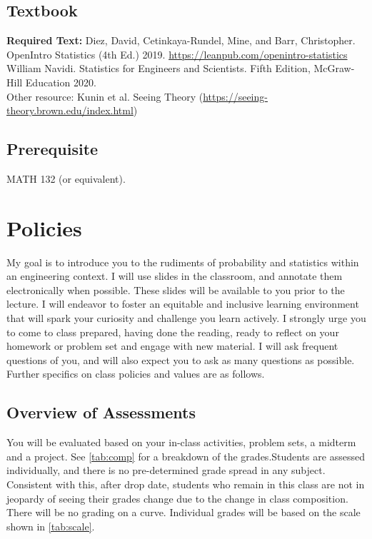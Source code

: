 \documentclass[11pt,twoside]{article}
\numberwithin{equation}{section}
\newcommand{\?}{\stackrel{?}{=}}
\begin{document}
\subsection{Textbook}

{\bf Required Text:}
Diez, David, Cetinkaya-Rundel, Mine, and Barr, Christopher. OpenIntro Statistics (4th Ed.) 2019.
\url{https://leanpub.com/openintro-statistics}\\

William Navidi. Statistics for Engineers and Scientists. Fifth Edition, McGraw-Hill Education 2020. \\

\noindent Other resource: Kunin et al. Seeing Theory (\url{https://seeing-theory.brown.edu/index.html})
\subsection{Prerequisite}
MATH 132 (or equivalent).

\section{Policies}
My goal is to introduce you to the rudiments of probability and statistics within an engineering context.
I will use slides in the classroom, and annotate them electronically when possible.
These slides will be available to you prior to the lecture.
I will endeavor to foster an equitable and inclusive learning environment that will spark your curiosity and challenge you learn actively.
I strongly urge you to come to class prepared, having done the reading, ready to reflect on your homework or problem set and engage with new material.
I will ask frequent questions of you, and will also expect you to ask as many questions as possible.
Further specifics on class policies and values are as follows.

\subsection{Overview of Assessments}
You will be evaluated based on your in-class activities, problem sets, a midterm and a project.
See \autoref{tab:comp} for a breakdown of the grades.Students are assessed individually, and there is no pre-determined grade spread in any subject.
Consistent with this, after drop date, students who remain in this class are not in jeopardy of seeing their grades change due to the change in class composition.
There will be no grading on a curve. 
Individual grades will be based on the scale shown in \autoref{tab:scale}.
\end{document}
